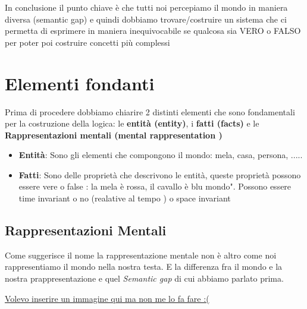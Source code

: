 \documentclass [12pt, letterpaper]{article}
\begin{document}
	In conclusione il punto chiave è che tutti noi percepiamo il mondo in maniera diversa (semantic gap) e quindi dobbiamo trovare/costruire un sistema che ci permetta di esprimere in maniera inequivocabile se qualcosa sia VERO o FALSO per poter poi costruire concetti più complessi
	
	\section{Elementi fondanti}
	
	Prima di procedere dobbiamo chiarire 2 distinti elementi che sono fondamentali per la costruzione della logica:
	le \textbf{entità (entity)}, i \textbf{fatti (facts)} e le \textbf{Rappresentazioni mentali (mental rappresentation )} 
	
	\begin{itemize}
		\item \textbf{Entità}: Sono gli elementi che compongono il mondo: mela, casa, persona, ..... 
			
		\item \textbf{Fatti}:
		Sono delle proprietà che descrivono le entità, queste proprietà possono essere vere o false : la mela è rossa, il cavallo è blu mondo". Possono essere time invariant o no (realative al tempo ) o space invariant 
	\end{itemize}
	
	
	\subsection{Rappresentazioni Mentali}
	
	Come suggerisce il nome la rappresentazione mentale non è altro come noi rappresentiamo il mondo nella nostra testa. E la differenza fra il mondo e la nostra prappresentazione e quel \textit{Semantic gap} di cui abbiamo parlato prima.
	
		\underline{Volevo inserire un immagine qui ma non me lo fa fare :(}
	
	
	
\end{document}
